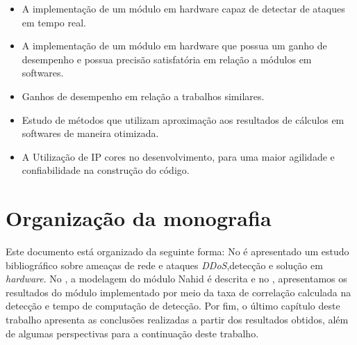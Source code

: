 \begin{itemize}

\item  A implementação de um módulo em hardware capaz de detectar de ataques em tempo real.

\item  A implementação de um módulo em hardware que possua um ganho de desempenho e possua precisão satisfatória em relação a módulos em softwares.

\item Ganhos de desempenho em relação a trabalhos similares.	

	
	\item  Estudo de métodos que utilizam aproximação aos resultados de cálculos em softwares de maneira otimizada.
	
	\item A Utilização de IP cores no desenvolvimento, para uma maior agilidade e confiabilidade na construção do código. 
	
\end{itemize}
\section{Organização da monografia}
Este documento está organizado da seguinte forma: No  é apresentado um estudo bibliográfico sobre ameaças de rede e ataques \textit{DDoS},detecção e solução em \textit{hardware}. No , a modelagem do módulo Nahid é descrita e no , apresentamos os resultados  do módulo implementado por meio da taxa de correlação calculada na detecção e tempo de computação de detecção. Por fim, o último capítulo deste trabalho apresenta as conclusões realizadas a partir dos resultados obtidos, além de algumas perspectivas para a continuação deste trabalho.